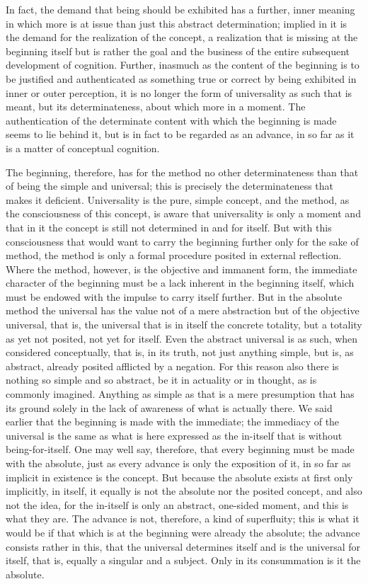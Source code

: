 In fact, the demand that being should be exhibited has
a further, inner meaning in which more is at issue
than just this abstract determination;
implied in it is the demand for the realization of the concept,
a realization that is missing at the beginning itself
but is rather the goal and the business of the
entire subsequent development of cognition.
Further, inasmuch as the content of the beginning is
to be justified and authenticated as something true or correct
by being exhibited in inner or outer perception,
it is no longer the form of universality as such
that is meant, but its determinateness,
about which more in a moment.
The authentication of the determinate content
with which the beginning is made seems to lie behind it,
but is in fact to be regarded as an advance,
in so far as it is a matter of conceptual cognition.

The beginning, therefore, has for the method no other determinateness
than that of being the simple and universal;
this is precisely the determinateness that makes it deficient.
Universality is the pure, simple concept,
and the method, as the consciousness of this concept,
is aware that universality is only a moment
and that in it the concept is still not determined in and for itself.
But with this consciousness that would want to carry
the beginning further only for the sake of method,
the method is only a formal procedure posited in external reflection.
Where the method, however, is the objective and immanent form,
the immediate character of the beginning must be
a lack inherent in the beginning itself,
which must be endowed with the
impulse to carry itself further.
But in the absolute method the universal
has the value not of a mere abstraction
but of the objective universal, that is,
the universal that is in itself the concrete totality,
but a totality as yet not posited, not yet for itself.
Even the abstract universal is as such,
when considered conceptually, that is, in its truth,
not just anything simple, but is, as abstract,
already posited afflicted by a negation.
For this reason also there is nothing so simple and so abstract,
be it in actuality or in thought, as is commonly imagined.
Anything as simple as that is a mere presumption
that has its ground solely in the lack of
awareness of what is actually there.
We said earlier that the beginning is
made with the immediate;
the immediacy of the universal is the same as
what is here expressed as the in-itself
that is without being-for-itself.
One may well say, therefore, that every
beginning must be made with the absolute,
just as every advance is only the exposition of it,
in so far as implicit in existence is the concept.
But because the absolute exists
at first only implicitly, in itself,
it equally is not the absolute
nor the posited concept,
and also not the idea,
for the in-itself is only
an abstract, one-sided moment,
and this is what they are.
The advance is not, therefore, a kind of superfluity;
this is what it would be if that which is
at the beginning were already the absolute;
the advance consists rather in this,
that the universal determines itself
and is the universal for itself,
that is, equally a singular and a subject.
Only in its consummation is it the absolute.

